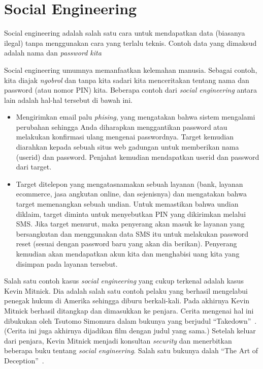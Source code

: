 \chapter{Social Engineering}
Social engineering adalah salah satu cara untuk mendapatkan data
(biasanya ilegal) tanpa menggunakan cara yang terlalu teknis.
Contoh data yang dimaksud adalah nama dan {\em password kita}

Social engineering umumnya memanfaatkan kelemahan manusia.
Sebagai contoh, kita diajak {\em ngobrol} dan tanpa kita sadari
kita menceritakan tentang nama dan password (atau nomor PIN) kita.
Beberapa contoh dari {\em social engineering} antara lain adalah
hal-hal tersebut di bawah ini.

\begin{itemize}
    \item Mengirimkan email palu {\em phising}, yang mengatakan bahwa
    sistem mengalami perubahan sehingga Anda diharapkan menggantikan
    password atau melakukan konfirmasi ulang mengenai passwordnya.
    Target kemudian diarahkan kepada sebuah situs web gadungan
    untuk memberikan nama (userid) dan password. Penjahat kemudian
    mendapatkan userid dan password dari target.
    \item Target ditelepon yang mengatasnamakan sebuah layanan
    (bank, layanan ecommerce, jasa angkutan online, dan sejenisnya)
    dan mengatakan bahwa target memenangkan sebuah undian.
    Untuk memastikan bahwa undian diklaim, target diminta untuk 
    menyebutkan PIN yang dikirimkan melalui SMS. Jika target menurut,
    maka penyerang akan masuk ke layanan yang bersangkutan dan 
    menggunakan data SMS itu untuk melakukan password reset
    (sesuai dengan password baru yang akan dia berikan).
    Penyerang kemudian akan mendapatkan akun kita dan menghabisi
    uang kita yang disimpan pada layanan tersebut.
\end{itemize}

Salah satu contoh kasus {\em social engineering} yang cukup terkenal
adalah kasus Kevin Mitnick. Dia adalah salah satu contoh pelaku
yang berhasil mengelabui penegak hukum di Amerika sehingga diburu
berkali-kali.
Pada akhirnya Kevin Mitnick berhasil ditangkap dan dimasukkan ke penjara.
Cerita mengenai hal ini dibukukan oleh Tsutomo Simomura dalam bukunya
yang berjudul ``Takedown''~\cite{takedown}. (Cerita ini juga akhirnya
dijadikan film dengan judul yang sama.)
Setelah keluar dari penjara, Kevin Mitnick menjadi konsultan
{\em security} dan menerbitkan beberapa buku tentang {\em social engineering}.
Salah satu bukunya dalah ``The Art of Deception''~\cite{mitnickdeception}.